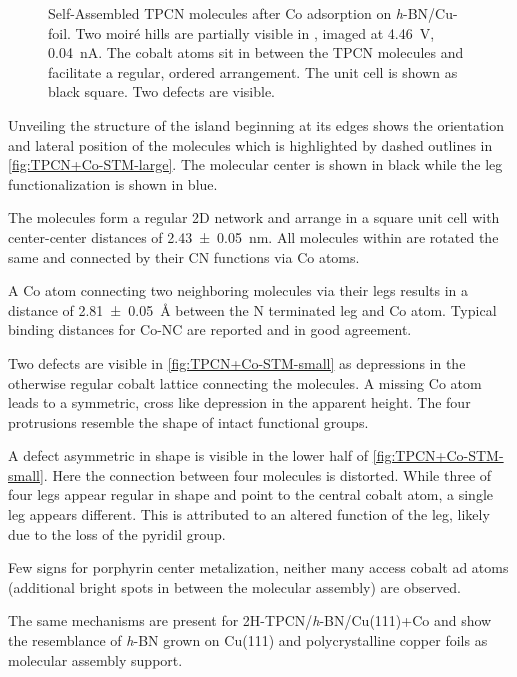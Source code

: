 \begin{figure}[!h]
{		\label{fig:TPCN+Co-STM-small-model}
	}
	\caption{Self-Assembled TPCN molecules after Co adsorption on \textit{h}-BN/Cu-foil. Two moir\'e hills are partially visible in , imaged at \SI{4.46}{\volt}, \SI{0.04}{\nano\ampere}.  The cobalt atoms sit in between the TPCN molecules and facilitate a regular, ordered arrangement. The unit cell is shown as black square. Two defects are visible.}%
	\label{fig:TPCN+Co-STM}%
\end{figure}%

Unveiling the structure of the island beginning at its edges shows the orientation and lateral position of the molecules which is highlighted by dashed outlines in \autoref{fig:TPCN+Co-STM-large}. The molecular center is shown in black while the leg functionalization is shown in blue.

The molecules form a regular 2D network and arrange in a square unit cell with center-center distances of \SI{2.43 \pm 0.05}{\nano \meter}. All molecules within are rotated the same and connected by their CN functions via Co atoms. 

A Co atom connecting two neighboring molecules via their legs results in a distance of \SI{2.81 \pm 0.05}{\angstrom} between the N terminated leg and Co atom. Typical binding distances for Co-NC are reported \cite{schlickum_metalorganic_2007, przychodzen_supramolecular_2006} and in good agreement.

Two defects are visible in \autoref{fig:TPCN+Co-STM-small} as depressions in the otherwise regular cobalt lattice connecting the molecules. A missing Co atom leads to a symmetric, cross like depression in the apparent height. The four protrusions resemble the shape of intact functional groups.

A defect asymmetric in shape is visible in the lower half of \autoref{fig:TPCN+Co-STM-small}. Here the connection between four molecules is distorted. While three of four legs appear regular in shape and point to the central cobalt atom, a single leg appears different. This is attributed to an altered function of the leg, likely due to the loss of the pyridil group.

Few signs for porphyrin center metalization, neither many access cobalt ad atoms (additional bright spots in between the molecular assembly) are observed. 

The same mechanisms are present for 2H-TPCN/\textit{h}-BN/Cu(111)+Co \cite{urgel_controlling_2015} and show the resemblance of \textit{h}-BN grown on Cu(111) and polycrystalline copper foils as molecular assembly support.

